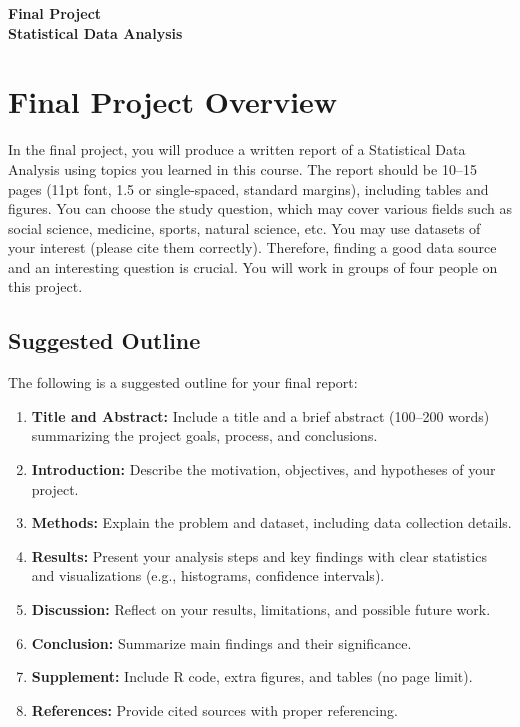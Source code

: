 \documentclass[12pt]{article}
\begin{document}
\begin{center}
\textbf{\Large Final Project \\ Statistical Data Analysis} 
\end{center}


\section*{Final Project Overview}

In the final project, you will produce a written report of a Statistical Data Analysis using topics you learned in this course.  
The report should be 10--15 pages (11pt font, 1.5 or single-spaced, standard margins), including tables and figures.  
You can choose the study question, which may cover various fields such as social science, medicine, sports, natural science, etc.  
You may use datasets of your interest (please cite them correctly).  
Therefore, finding a good data source and an interesting question is crucial.  
You will work in groups of four people on this project.

\subsection*{Suggested Outline}

The following is a suggested outline for your final report:  
\begin{enumerate}
    \item \textbf{Title and Abstract:} Include a title and a brief abstract (100--200 words) summarizing the project goals, process, and conclusions.  
    \item \textbf{Introduction:} Describe the motivation, objectives, and hypotheses of your project.  
    \item \textbf{Methods:} Explain the problem and dataset, including data collection details.  
    \item \textbf{Results:} Present your analysis steps and key findings with clear statistics and visualizations (e.g., histograms, confidence intervals).  
    \item \textbf{Discussion:} Reflect on your results, limitations, and possible future work.  
    \item \textbf{Conclusion:} Summarize main findings and their significance.  
    \item \textbf{Supplement:} Include R code, extra figures, and tables (no page limit).  
    \item \textbf{References:} Provide cited sources with proper referencing.  
\end{enumerate}
\end{document}
